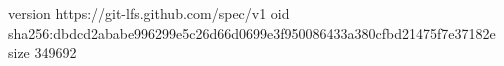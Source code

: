 version https://git-lfs.github.com/spec/v1
oid sha256:dbdcd2ababe996299e5c26d66d0699e3f950086433a380cfbd21475f7e37182e
size 349692
